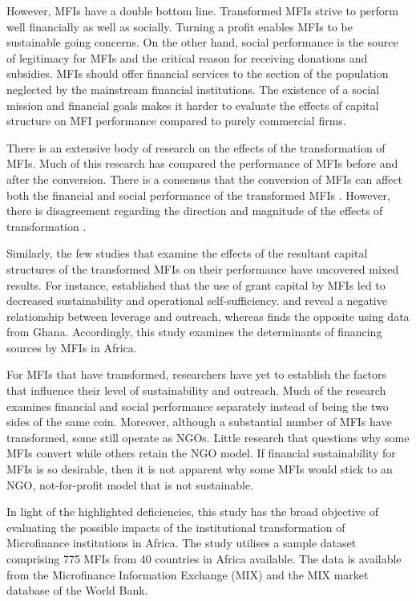 \documentclass[a4paper, nobind]{templates/ociamthesis}
\begin{document}
However, MFIs have a double bottom line. Transformed MFIs strive to perform well financially as well as socially. Turning a profit enables MFIs to be sustainable going concerns. On the other hand, social performance is the source of legitimacy for MFIs and the critical reason for receiving donations and subsidies. MFIs should offer financial services to the section of the population neglected by the mainstream financial institutions. The existence of a social mission and financial goals makes it harder to evaluate the effects of capital structure on MFI performance compared to purely commercial firms.

There is an extensive body of research on the effects of the transformation of MFIs. Much of this research has compared the performance of MFIs before and after the conversion. There is a consensus that the conversion of MFIs can affect both the financial and social performance of the transformed MFIs \autocite{chahine2010social,mersland2010microfinance}. However, there is disagreement regarding the direction and magnitude of the effects of transformation \autocite{mersland2010microfinance,d2017ngos}.

Similarly, the few studies that examine the effects of the resultant capital structures of the transformed MFIs on their performance have uncovered mixed results. For instance, \textcite{bogan2012capital} established that the use of grant capital by MFIs led to decreased sustainability and operational self-sufficiency. \textcite{hoque2011commercialization} and \textcite{kar2012does} reveal a negative relationship between leverage and outreach, whereas \textcite{kyereboah2007determinants} finds the opposite using data from Ghana. Accordingly, this study examines the determinants of financing sources by MFIs in Africa.

For MFIs that have transformed, researchers have yet to establish the factors that influence their level of sustainability and outreach. Much of the research examines financial and social performance separately instead of being the two sides of the same coin. Moreover, although a substantial number of MFIs have transformed, some still operate as NGOs. Little research that questions why some MFIs convert while others retain the NGO model. If financial sustainability for MFIs is so desirable, then it is not apparent why some MFIs would stick to an NGO, not-for-profit model that is not sustainable.

In light of the highlighted deficiencies, this study has the broad objective of evaluating the possible impacts of the institutional transformation of Microfinance institutions in Africa. The study utilises a sample dataset comprising 775 MFIs from 40 countries in Africa available. The data is available from the Microfinance Information Exchange (MIX) and the MIX market database of the World Bank.
\end{document}
